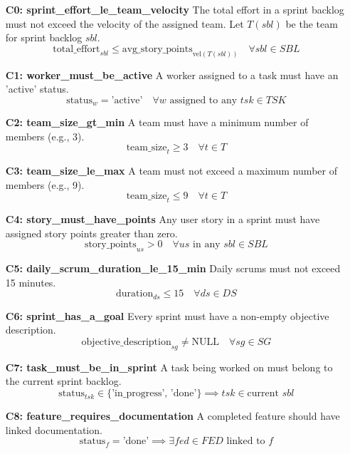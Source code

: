 \documentclass[11pt]{article}
\begin{document}
\begin{itemize}
    \item[\textbf{C0: sprint\_effort\_le\_team\_velocity}] The total effort in a sprint backlog must not exceed the velocity of the assigned team. Let $T(sbl)$ be the team for sprint backlog $sbl$.
    $$ \text{total\_effort}_{sbl} \leq \text{avg\_story\_points}_{\text{vel}(T(sbl))} \quad \forall sbl \in SBL $$

    \item[\textbf{C1: worker\_must\_be\_active}] A worker assigned to a task must have an 'active' status.
    $$ \text{status}_{w} = \text{'active'} \quad \forall w \text{ assigned to any } tsk \in TSK $$

    \item[\textbf{C2: team\_size\_gt\_min}] A team must have a minimum number of members (e.g., 3).
    $$ \text{team\_size}_{t} \geq 3 \quad \forall t \in T $$

    \item[\textbf{C3: team\_size\_le\_max}] A team must not exceed a maximum number of members (e.g., 9).
    $$ \text{team\_size}_{t} \leq 9 \quad \forall t \in T $$

    \item[\textbf{C4: story\_must\_have\_points}] Any user story in a sprint must have assigned story points greater than zero.
    $$ \text{story\_points}_{us} > 0 \quad \forall us \text{ in any } sbl \in SBL $$

    \item[\textbf{C5: daily\_scrum\_duration\_le\_15\_min}] Daily scrums must not exceed 15 minutes.
    $$ \text{duration}_{ds} \leq 15 \quad \forall ds \in DS $$

    \item[\textbf{C6: sprint\_has\_a\_goal}] Every sprint must have a non-empty objective description.
    $$ \text{objective\_description}_{sg} \neq \text{NULL} \quad \forall sg \in SG $$

    \item[\textbf{C7: task\_must\_be\_in\_sprint}] A task being worked on must belong to the current sprint backlog.
    $$ \text{status}_{tsk} \in \{\text{'in\_progress', 'done'}\} \implies tsk \in \text{current } sbl $$

    \item[\textbf{C8: feature\_requires\_documentation}] A completed feature should have linked documentation.
    $$ \text{status}_{f} = \text{'done'} \implies \exists fed \in FED \text{ linked to } f $$


\end{itemize}
\end{document}
